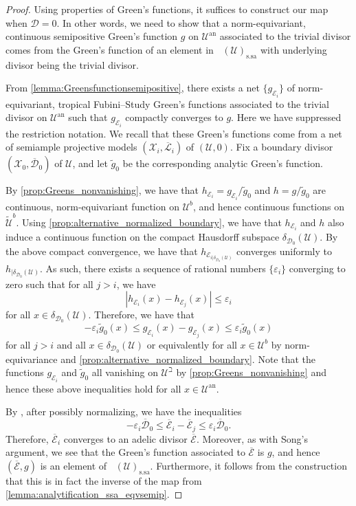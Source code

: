\documentclass[11pt,reqno]{amsart}
\newcommand{\cX}{\mathcal{X}}
\newcommand{\cE}{\mathcal{E}}
\newcommand{\cD}{\mathcal{D}}
\newcommand{\cU}{\mathcal{U}}
\newcommand{\wt}[1]{\widetilde{#1}}
\newcommand{\cL}{\mathcal{L}}
\theoremstyle{theorem}
\numberwithin{equation}{subsection}
\numberwithin{equation}{subsection}
\theoremstyle{definition}
\theoremstyle{remark}
\numberwithin{equation}{subsubsection} \numberwithin{figure}{section}
\DeclareMathOperator{\an}{an}
\DeclareMathOperator{\aCaCl}{\widehat{CaCl}}
\renewcommand{\leq}{\leqslant}
\DeclareMathOperator{\ssa}{s.sa}
\begin{document}
\begin{proof}
Using properties of Green's functions, it suffices to construct our map when $\cD = 0$. 
In other words, we need to show that a norm-equivariant, continuous semipositive Green's function $g$ on $\cU^{\an}$ associated to the trivial divisor comes from the Green's function of an element in $\aCaCl(\cU)_{\ssa}$ with underlying divisor being the trivial divisor.


From \autoref{lemma:Greensfunctionsemipositive}, there exists a net $\{ g_{\cE_i}\}$ of norm-equivariant,  tropical Fubini--Study Green's functions associated to the trivial divisor on $\cU^{\an}$ such that $g_{\cE_i}$ compactly converges to $g$. 
Here we have suppressed the restriction notation. 
We recall that these Green's functions come from a net of semiample projective models $(\cX_i,\overline{\cL}_i)$ of $(\cU,0)$. 
Fix a boundary divisor $(\cX_0,\overline{\cD}_0)$ of $\cU$, and let $\wt{g}_{0}$ be the corresponding analytic Green's function. 


By \autoref{prop:Greens_nonvanishing}, we have that $h_{\cE_i} = g_{\cE_i}/\wt{g}_0$ and $h = g/\wt{g}_0$ are continuous, norm-equivariant function on $\cU^{b}$, and hence continuous functions on $\wt{\cU}^b$. 
Using \autoref{prop:alternative_normalized_boundary}, we have that $h_{\cE_i}$ and $h$ also induce a continuous function on the compact Hausdorff subspace $\delta_{\cD_0}(\cU)$. 
By the above compact convergence, we have that $h_{\cE_{i|\delta_{\cD_0}(\cU)}}$ converges uniformly to $h_{|\delta_{\cD_0}(\cU)}$. 
As such, there exists a sequence of rational numbers $\{ \varepsilon_i\}$ converging to zero such that for all $j>i$, we have
\[
|h_{\cE_i}(x) - h_{\cE_j}(x)| \leq \varepsilon_i
\]
for all $x\in \delta_{\cD_0}(\cU)$. 
Therefore, we have that 
\[
-\varepsilon_i \wt{g}_{0}(x) \leq g_{\cE_i}(x) - g_{\cE_j}(x) \leq \varepsilon_i \wt{g}_{0}(x)
\]
for all $j>i$ and all $x\in \delta_{\cD_0}(\cU)$ or equivalently for all $x\in \cU^b$ by norm-equivariance and \autoref{prop:alternative_normalized_boundary}. 
Note that the functions $g_{\cE_i}$ and $\wt{g}_{0}$ all vanishing on $\cU^{\beth}$ by \autoref{prop:Greens_nonvanishing} and hence these above inequalities hold for all $x\in \cU^{\an}.$

By \cite[Lemma 3.3.3]{YuanZhang:AdelicLineBundles}, after possibly normalizing, we have the inequalities
\[
-\varepsilon_i \overline{\cD}_0 \leq \overline{\cE}_i - \overline{\cE}_j \leq \varepsilon_i \overline{\cD}_0.
\]
Therefore, $\overline{\cE}_i$ converges to an adelic divisor $\overline{\cE}$.
Moreover, as with Song's argument, we see that the Green's function associated to $\overline{\cE}$ is $g$, and hence $(\overline{\cE},g)$ is an element of $\aCaCl(\cU)_{\ssa}$. 
Furthermore, it follows from the construction that this is in fact the inverse of the map from \autoref{lemma:analytification_ssa_eqvsemip}. 
\end{proof}
\end{document}
